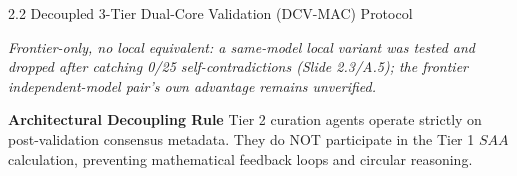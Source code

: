 \documentclass[aspectratio=169,11pt]{beamer}
\begin{document}
\begin{frame}{2.2 Decoupled 3-Tier Dual-Core Validation (DCV-MAC) Protocol}

\vspace{0.5mm}
\tiny\textit{Frontier-only, no local equivalent: a same-model local variant was tested and dropped after catching 0/25 self-contradictions (Slide 2.3/A.5); the frontier independent-model pair's own advantage remains unverified.}
\normalsize
\vspace{0.5mm}
\begin{block}{\textbf{Architectural Decoupling Rule}}
Tier 2 curation agents operate strictly on post-validation consensus metadata. They do NOT participate in the Tier 1 $SAA$ calculation, preventing mathematical feedback loops and circular reasoning.
\end{block}
\end{frame}
\end{document}
